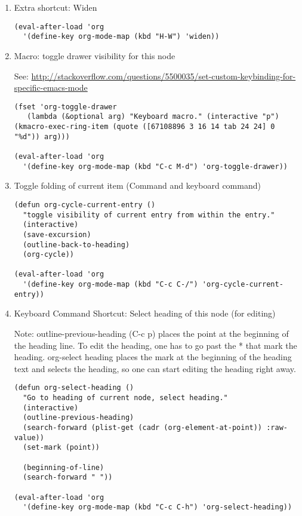 \documentclass[nofonts]{tufte-handout}
\begin{document}
\begin{enumerate}
\item Extra shortcut: Widen
\label{sec-2-5-14-1}
\begin{verbatim}
(eval-after-load 'org
  '(define-key org-mode-map (kbd "H-W") 'widen))
\end{verbatim}
\item Macro: toggle drawer visibility for this node
\label{sec-2-5-14-2}

See: \url{http://stackoverflow.com/questions/5500035/set-custom-keybinding-for-specific-emacs-mode}

\begin{verbatim}
(fset 'org-toggle-drawer
   (lambda (&optional arg) "Keyboard macro." (interactive "p") (kmacro-exec-ring-item (quote ([67108896 3 16 14 tab 24 24] 0 "%d")) arg)))

(eval-after-load 'org
  '(define-key org-mode-map (kbd "C-c M-d") 'org-toggle-drawer))
\end{verbatim}

\item Toggle folding of current item (Command and keyboard command)
\label{sec-2-5-14-3}

\begin{verbatim}
(defun org-cycle-current-entry ()
  "toggle visibility of current entry from within the entry."
  (interactive)
  (save-excursion)
  (outline-back-to-heading)
  (org-cycle))

(eval-after-load 'org
  '(define-key org-mode-map (kbd "C-c C-/") 'org-cycle-current-entry))
\end{verbatim}

\item Keyboard Command Shortcut: Select heading of this node (for editing)
\label{sec-2-5-14-4}

Note: outline-previous-heading (C-c p) places the point at the beginning of the heading line.  To edit the heading, one has to go past the * that mark the heading.  org-select heading places the mark at the beginning of the heading text and selects the heading, so one can start editing the heading right away.

\begin{verbatim}
(defun org-select-heading ()
  "Go to heading of current node, select heading."
  (interactive)
  (outline-previous-heading)
  (search-forward (plist-get (cadr (org-element-at-point)) :raw-value))
  (set-mark (point))

  (beginning-of-line)
  (search-forward " "))

(eval-after-load 'org
  '(define-key org-mode-map (kbd "C-c C-h") 'org-select-heading))
\end{verbatim}
\end{enumerate}
\end{document}
